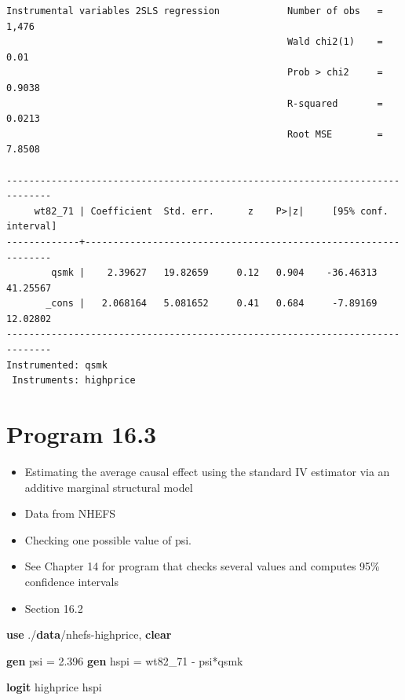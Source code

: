 \documentclass[
  10pt,
]{book}
\newenvironment{Shaded}{\begin{snugshade}}{\end{snugshade}}
\newcommand{\KeywordTok}[1]{\textcolor[rgb]{0.13,0.29,0.53}{\textbf{#1}}}
\newcommand{\NormalTok}[1]{#1}
\providecommand{\tightlist}{%
  \setlength{\itemsep}{0pt}\setlength{\parskip}{0pt}}
\begin{document}
\begin{verbatim}
Instrumental variables 2SLS regression            Number of obs   =      1,476
                                                  Wald chi2(1)    =       0.01
                                                  Prob > chi2     =     0.9038
                                                  R-squared       =     0.0213
                                                  Root MSE        =     7.8508

------------------------------------------------------------------------------
     wt82_71 | Coefficient  Std. err.      z    P>|z|     [95% conf. interval]
-------------+----------------------------------------------------------------
        qsmk |    2.39627   19.82659     0.12   0.904    -36.46313    41.25567
       _cons |   2.068164   5.081652     0.41   0.684     -7.89169    12.02802
------------------------------------------------------------------------------
Instrumented: qsmk
 Instruments: highprice
\end{verbatim}

\hypertarget{program-16.3-1}{%
\section{Program 16.3}\label{program-16.3-1}}

\begin{itemize}
\tightlist
\item
  Estimating the average causal effect using the standard IV estimator via an additive marginal structural model
\item
  Data from NHEFS
\item
  Checking one possible value of psi.
\item
  See Chapter 14 for program that checks several values and computes 95\% confidence intervals\\
\item
  Section 16.2
\end{itemize}

\begin{Shaded}
\begin{Highlighting}[]
\KeywordTok{use}\NormalTok{ ./}\KeywordTok{data}\NormalTok{/nhefs{-}highprice, }\KeywordTok{clear}

\KeywordTok{gen}\NormalTok{ psi = 2.396}
\KeywordTok{gen}\NormalTok{ hspi = wt82\_71 {-} psi*qsmk}

\KeywordTok{logit}\NormalTok{ highprice hspi}
\end{Highlighting}
\end{Shaded}
\end{document}
